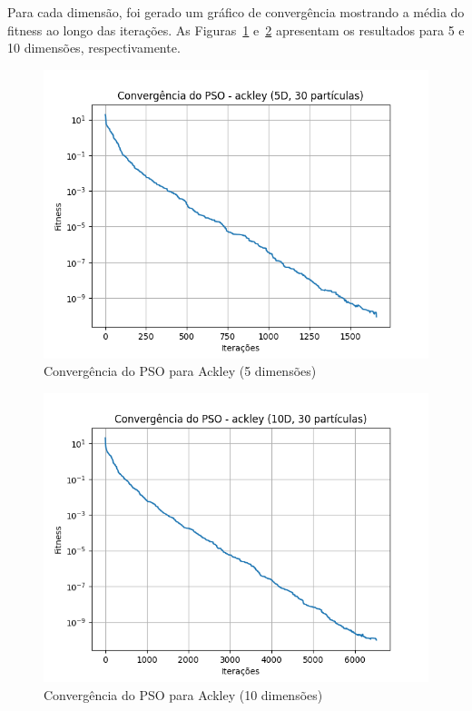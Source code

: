 \documentclass[12pt]{article}
\begin{document}
Para cada dimensão, foi gerado um gráfico de convergência mostrando a média do fitness ao longo das iterações. As Figuras~\ref{fig:convergencia5d} e~\ref{fig:convergencia10d} apresentam os resultados para 5 e 10 dimensões, respectivamente.

\begin{figure}[H]
  \centering
  \includegraphics[width=.9\textwidth]{convergencia_ackley_5D.png}
  \caption{Convergência do PSO para Ackley (5 dimensões)}
  \label{fig:convergencia5d}
\end{figure}

\begin{figure}[H]
  \centering
  \includegraphics[width=.9\textwidth]{convergencia_ackley_10D.png}
  \caption{Convergência do PSO para Ackley (10 dimensões)}
  \label{fig:convergencia10d}
\end{figure}
\end{document}
